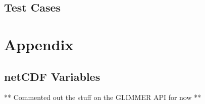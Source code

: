 \chapter{Test Cases}
\renewcommand{\dir}{tests}




%


%

%

%

\part{Appendix}
\label{ch:appendix}
\appendix
\renewcommand{\dir}{ug}
\chapter{netCDF Variables}

** Commented out the stuff on the GLIMMER API for now **
%
%
%
\renewcommand{\dir}{ext}


